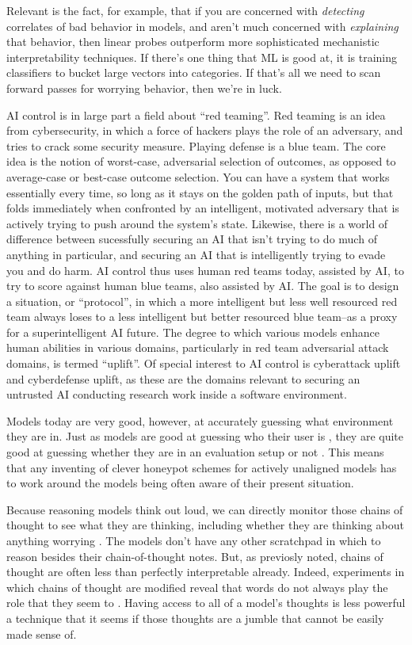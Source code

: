 Relevant is the fact, for example, that if you are concerned with
\emph{detecting} correlates of bad behavior in models, and aren't much
concerned with \emph{explaining} that behavior, then linear probes outperform
more sophisticated mechanistic interpretability techniques. If there's one
thing that ML is good at, it is training classifiers to bucket large vectors
into categories. If that's all we need to scan forward passes for worrying
behavior, then we're in luck.

AI control is in large part a field about ``red teaming''. Red teaming is an
idea from cybersecurity, in which a force of hackers plays the role of an
adversary, and tries to crack some security measure. Playing defense is a blue
team. The core idea is the notion of worst-case, adversarial selection of
outcomes, as opposed to average-case or best-case outcome selection. You can
have a system that works essentially every time, so long as it stays on the
golden path of inputs, but that folds immediately when confronted by an
intelligent, motivated adversary that is actively trying to push around the
system's state. Likewise, there is a world of difference between sucessfully
securing an AI that isn't trying to do much of anything in particular, and
securing an AI that is intelligently trying to evade you and do harm. AI
control thus uses human red teams today, assisted by AI, to try to score
against human blue teams, also assisted by AI. The goal is to design a
situation, or ``protocol'', in which a more intelligent but less well resourced
red team always loses to a less intelligent but better resourced blue team--as
a proxy for a superintelligent AI future. The degree to which various models
enhance human abilities in various domains, particularly in red team
adversarial attack domains, is termed ``uplift''. Of special interest to AI
control is cyberattack uplift and cyberdefense uplift, as these are the domains
relevant to securing an untrusted AI conducting research work inside a software
environment.

Models today are very good, however, at accurately guessing what environment
they are in. Just as models are good at guessing who their user
is \cite{derner2024truesight}, they are quite good at guessing whether they are
in an evaluation setup or not \cite{needham2025know}. This means that any
inventing of clever honeypot schemes for actively unaligned models has to work
around the models being often aware of their present situation.

Because reasoning models think out loud, we can directly monitor those chains
of thought to see what they are thinking, including whether they are thinking
about anything worrying \cite{baker2025monitoring}. The models don't have any
other scratchpad in which to reason besides their chain-of-thought notes. But,
as previosly noted, chains of thought are often less than perfectly
interpretable already. Indeed, experiments in which chains of thought are
modified reveal that words do not always play the role that they seem to
\cite{}. Having access to all of a model's thoughts is less powerful a
technique that it seems if those thoughts are a jumble that cannot be easily
made sense of.

